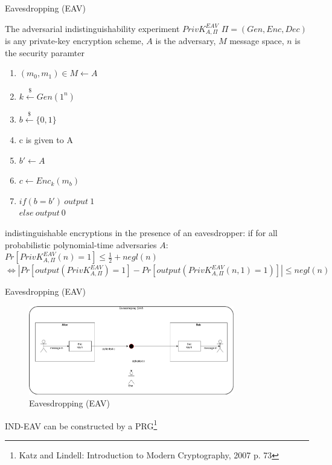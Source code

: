 \documentclass[ucs,9pt]{beamer}
\begin{document}
\begin{frame}{Eavesdropping (EAV)}
    \begin{block}{The adversarial indistinguishability experiment $PrivK_{A,\Pi}^{EAV}$}
        $\Pi = (Gen, Enc, Dec)$ is any private-key encryption scheme, $A$ is the adversary, $M$ message space, $n$ is the security paramter\\
        
        \begin{enumerate}
            \item $(m_0,m_1) \in M \leftarrow A$
            \item $k \overset{\$}{\leftarrow} Gen(1^n)$
            \item $b \overset{\$}{\leftarrow} \{0,1\}$
            \item c is given to A
            \item $b' \leftarrow A$
            \item $c \leftarrow Enc_{k}(m_b)$
                \item $if(b = b')\ output\ 1$ \\
                $else\ output\ 0$
        \end{enumerate}
        
        indistinguishable encryptions in the presence of an eavesdropper: if for all probabilistic polynomial-time adversaries $A$:\\
        $Pr[PrivK_{A,\Pi}^{EAV}(n) = 1] \leq \frac{1}{2} + negl(n)$
        $\Leftrightarrow \left | Pr[output(PrivK_{A,\Pi}^{EAV}) = 1] - Pr[output(PrivK_{A,\Pi}^{EAV}(n,1) = 1)] \right | \leq negl(n)$
    \end{block}
\end{frame}

\begin{frame}{Eavesdropping (EAV)}
    
    \begin{figure}[h]
        \centering
        \includegraphics[width=0.8\textwidth]{figures/EAV.png}
        \caption{Eavesdropping (EAV)}
    \end{figure}
    IND-EAV can be constructed by a PRG\footnote{Katz and Lindell: Introduction to Modern Cryptography, 2007 p. 73}
\end{frame}
\end{document}
